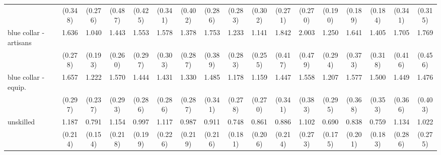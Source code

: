 {\begin{tabular}{l*{16}{c}}
                    &     (0.348)         &     (0.276)         &     (0.487)         &     (0.425)         &     (0.341)         &     (0.402)         &     (0.286)         &     (0.283)         &     (0.302)         &     (0.271)         &     (0.270)         &     (0.190)         &     (0.189)         &     (0.184)         &     (0.341)         &     (0.315)         \\
[1em]
blue collar - artisans&       1.636\sym{**} &       1.040         &       1.443\sym{*}  &       1.553\sym{*}  &       1.578\sym{*}  &       1.378         &       1.753\sym{*}  &       1.233         &       1.141         &       1.842\sym{**} &       2.003\sym{**} &       1.250         &       1.641\sym{*}  &       1.405         &       1.705\sym{*}  &       1.769\sym{*}  \\
                    &     (0.278)         &     (0.193)         &     (0.260)         &     (0.297)         &     (0.303)         &     (0.287)         &     (0.389)         &     (0.283)         &     (0.255)         &     (0.417)         &     (0.479)         &     (0.294)         &     (0.373)         &     (0.318)         &     (0.416)         &     (0.456)         \\
[1em]
blue collar - equip.&       1.657\sym{**} &       1.222         &       1.570\sym{*}  &       1.444         &       1.431         &       1.330         &       1.485         &       1.178         &       1.159         &       1.447         &       1.558         &       1.207         &       1.577         &       1.500         &       1.449         &       1.476         \\
                    &     (0.297)         &     (0.237)         &     (0.293)         &     (0.286)         &     (0.286)         &     (0.287)         &     (0.341)         &     (0.278)         &     (0.270)         &     (0.341)         &     (0.383)         &     (0.295)         &     (0.368)         &     (0.353)         &     (0.366)         &     (0.403)         \\
[1em]
unskilled           &       1.187         &       0.791         &       1.154         &       0.997         &       1.117         &       0.987         &       0.911         &       0.748         &       0.861         &       0.886         &       1.102         &       0.690         &       0.838         &       0.759         &       1.134         &       1.022         \\
                    &     (0.214)         &     (0.154)         &     (0.218)         &     (0.199)         &     (0.226)         &     (0.219)         &     (0.216)         &     (0.181)         &     (0.206)         &     (0.214)         &     (0.273)         &     (0.175)         &     (0.201)         &     (0.183)         &     (0.286)         &     (0.275)         \\

\end{tabular}}
